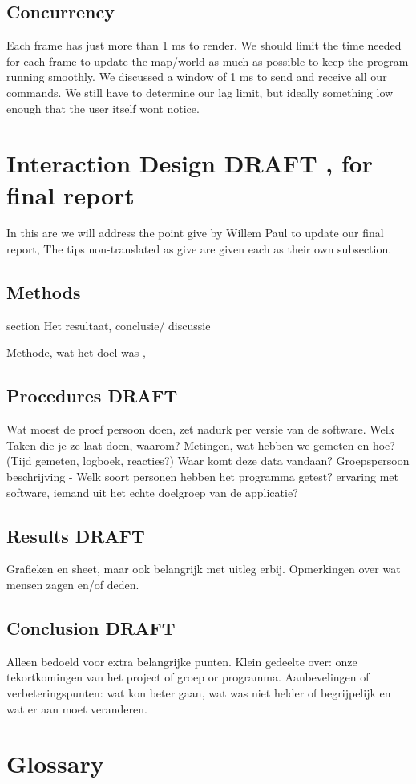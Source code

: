 \documentclass[11pt]{article}
\begin{document}
    \subsection{Concurrency}
    Each frame has just more than 1 ms to render. We should limit the time needed for each frame to update the map/world as much as possible to keep the program running smoothly. We discussed a window of 1 ms to send and receive all our commands. 
    We still have to determine our lag limit, but ideally something low enough that the user itself wont notice. 

\section{Interaction Design DRAFT , for final report}
In this are we will address the point give by Willem Paul to update our final report, The tips non-translated as give are given each as their own subsection.

\subsection{Methods} section
Het resultaat, conclusie/ discussie

Methode, wat het doel was , 

 \subsection{Procedures DRAFT}
Wat moest de proef persoon doen, zet nadurk per versie van de software.
Welk Taken die je ze laat doen, waarom?
Metingen, wat hebben we gemeten en hoe? (Tijd gemeten, logboek, reacties?) 
Waar komt deze data vandaan?
Groepspersoon beschrijving - Welk soort personen hebben het programma getest?
	ervaring met software, iemand uit het echte doelgroep van de applicatie?

 \subsection{Results DRAFT}
Grafieken en sheet, maar ook belangrijk met uitleg erbij. 
Opmerkingen over wat mensen zagen en/of deden. 

 \subsection{Conclusion DRAFT}
Alleen bedoeld voor extra belangrijke punten.
Klein gedeelte over: onze tekortkomingen van het project of groep or programma.
Aanbevelingen of verbeteringspunten: wat kon beter gaan, wat was niet helder of begrijpelijk en wat er aan moet veranderen.

\newpage
\section{Glossary}
\printglossary[title=]
\end{document}
